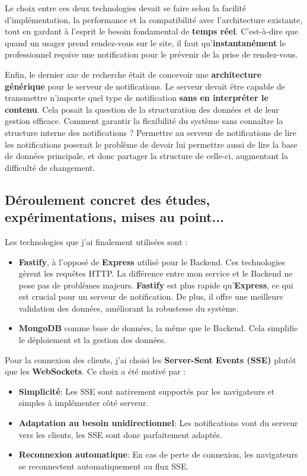Le choix entre ces deux technologies devait se faire selon la facilité
d'implémentation, la performance et la compatibilité avec l'architecture
existante, tout en gardant à l'esprit le besoin fondamental de {\bf temps réel}.
C'est-à-dire que quand un usager prend rendez-vous sur le site, il faut
qu'{\bf instantanément} le professionnel reçoive une notification pour le prévenir de
la prise de rendez-vous.

Enfin, le dernier axe de recherche était de concevoir une {\bf architecture
générique} pour le serveur de notifications. Le serveur devait être capable
de transmettre n'importe quel type de notification {\bf sans en interpréter le
contenu}. Cela posait la question de la structuration des données et de leur
gestion efficace. Comment garantir la flexibilité du système sans connaître la
structure interne des notifications ? Permettre au serveur de notifications de
lire les notifications poserait le problème de devoir lui permettre aussi de
lire la base de données principale, et donc partager la structure de celle-ci,
augmentant la difficulté de changement.

\subsection{Déroulement concret des études, expérimentations, mises au point...}

Les technologies que j'ai finalement utilisées sont :

\begin{itemize}
	\item {\bf Fastify}, à l'opposé de {\bf Express} utilisé pour le Backend. Ces technologies
gèrent les requêtes HTTP. La différence entre mon service et le Backend ne pose
pas de problèmes majeurs.
{\bf Fastify} est plus rapide qu'{\bf Express}, ce qui est crucial pour un serveur de
notification. De plus, il offre une meilleure validation des données, améliorant
la robustesse du système.
	\item {\bf MongoDB} comme base de données, la même que le Backend. Cela simplifie le
déploiement et la gestion des données.
\end{itemize}

Pour la connexion des clients, j'ai choisi les {\bf Server-Sent Events (SSE)}
plutôt que les {\bf WebSockets}. Ce choix a été motivé par :

\begin{itemize}
    \item {\bf Simplicité}: Les SSE sont nativement supportés par les navigateurs et simples
à implémenter côté serveur.
    \item {\bf Adaptation au besoin unidirectionnel}: Les notifications vont du serveur vers
les clients, les SSE sont donc parfaitement adaptés.
    \item {\bf Reconnexion automatique}: En cas de perte de connexion, les navigateurs se
reconnectent automatiquement au flux SSE.
\end{itemize}

